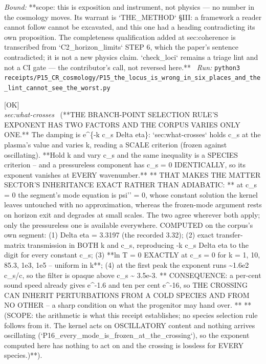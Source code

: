 \begin{description}
 \emph{Bound:} **scope: this is exposition and instrument, not physics --- no number in the cosmology moves. Its warrant is `THE\_METHOD` \S{}III: a framework a reader cannot follow cannot be excavated, and this one had a heading contradicting its own proposition. The completeness qualification added at sec:coherence is transcribed from `C2\_horizon\_limits` STEP 6, which the paper's sentence contradicted; it is not a new physics claim. `check\_loci` remains a triage lint and not a CI gate --- the contributor's call, not reversed here.**
\ \emph{Run:} \texttt{python3 receipts/P15\_CR\_cosmology/P15\_the\_locus\_is\_wrong\_in\_six\_places\_and\_the\_lint\_cannot\_see\_the\_worst.py}
\item[\rcptlabel{P15_the_filter_is_a_sound_speed_filter}{P15R80}\textbf{P15R80}\quad\texttt{P15\_the\_filter\_is\_a\_sound\_speed\_filter}]\hfill\textsf{[OK]}\\
\textit{sec:what-crosses} \ (**THE BRANCH-POINT SELECTION RULE'S EXPONENT HAS TWO FACTORS AND THE CORPUS VARIES ONLY ONE.** The damping is e\textasciicircum{}\{-k c\_s \textbar{}Delta eta\textbar{}\}: `sec:what-crosses` holds c\_s at the plasma's value and varies k, reading a SCALE criterion (frozen against oscillating). **Hold k and vary c\_s and the same inequality is a SPECIES criterion -- and a pressureless component has c\_s = 0 IDENTICALLY, so its exponent vanishes at EVERY wavenumber.** ** THAT MAKES THE MATTER SECTOR'S INHERITANCE EXACT RATHER THAN ADIABATIC: ** at c\_s = 0 the segment's mode equation is psi'' = 0, whose constant solution the kernel leaves untouched with no approximation, whereas the frozen-mode argument rests on horizon exit and degrades at small scales. The two agree wherever both apply; only the pressureless one is available everywhere. COMPUTED on the corpus's own segment: (1) \textbar{}Delta eta\textbar{} = 3.3197 (the recorded 3.32); (2) exact transfer-matrix transmission in BOTH k and c\_s, reproducing -k c\_s \textbar{}Delta eta\textbar{} to the digit for every constant c\_s; (3) **ln T = 0 EXACTLY at c\_s = 0 for k = 1, 10, 85.3, 1e3, 1e5 -- uniform in k**; (4) at the first peak the exponent runs \textasciitilde{}1.6e2 c\_s/c, so the filter is opaque above c\_s \textasciitilde{} 3.5e-3. ** CONSEQUENCE: a per-cent sound speed already gives e\textasciicircum{}-1.6 and ten per cent e\textasciicircum{}-16, so THE CROSSING CAN INHERIT PERTURBATIONS FROM A COLD SPECIES AND FROM NO OTHER -- a sharp condition on what the progenitor may hand over. ** **(SCOPE: the arithmetic is what this receipt establishes; no species selection rule follows from it. The kernel acts on OSCILLATORY content and nothing arrives oscillating (`P16\_every\_mode\_is\_frozen\_at\_the\_crossing`), so the exponent computed here has nothing to act on and the crossing is lossless for EVERY species.)**). 

\end{description}
